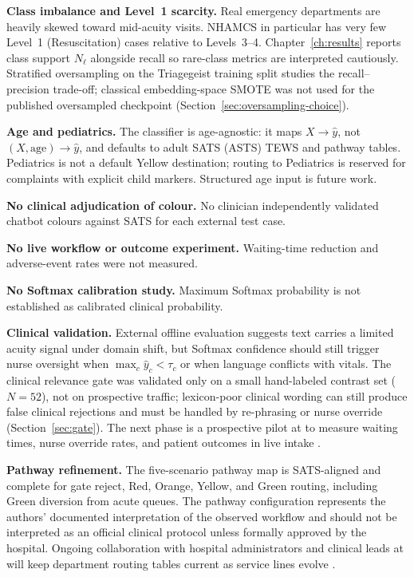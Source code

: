 \textbf{Class imbalance and Level~1 scarcity.} Real emergency departments are heavily skewed toward mid-acuity visits. NHAMCS in particular has very few Level~1 (Resuscitation) cases relative to Levels~3--4. Chapter~\ref{ch:results} reports class support \(N_\ell\) alongside recall so rare-class metrics are interpreted cautiously. Stratified oversampling on the Triagegeist training split studies the recall--precision trade-off; classical embedding-space SMOTE was not used for the published oversampled checkpoint (Section~\ref{sec:oversampling-choice}).

\textbf{Age and pediatrics.} The classifier is age-agnostic: it maps \(X\to\hat{y}\), not \((X,\mathrm{age})\to\hat{y}\), and defaults to adult SATS (ASTS) TEWS and pathway tables. Pediatrics is not a default Yellow destination; routing to Pediatrics is reserved for complaints with explicit child markers. Structured age input is future work.

\textbf{No clinical adjudication of colour.} No clinician independently validated chatbot colours against SATS for each external test case.

\textbf{No live workflow or outcome experiment.} Waiting-time reduction and adverse-event rates were not measured.

\textbf{No Softmax calibration study.} Maximum Softmax probability is not established as calibrated clinical probability.

\textbf{Clinical validation.} External offline evaluation suggests text carries a limited acuity signal under domain shift, but Softmax confidence should still trigger nurse oversight when \(\max_c\hat{y}_c < \tau_c\) or when language conflicts with vitals. The clinical relevance gate was validated only on a small hand-labeled contrast set (\(N=52\)), not on prospective \examplehospital{} traffic; lexicon-poor clinical wording can still produce false clinical rejections and must be handled by re-phrasing or nurse override (Section~\ref{sec:gate}). The next phase is a prospective pilot at \examplehospital{} to measure waiting times, nurse override rates, and patient outcomes in live intake \citep{Mitchell2023}.

\textbf{Pathway refinement.} The five-scenario pathway map is SATS-aligned and complete for gate reject, Red, Orange, Yellow, and Green routing, including Green diversion from acute queues. The pathway configuration represents the authors' documented interpretation of the observed workflow and should not be interpreted as an official clinical protocol unless formally approved by the hospital. Ongoing collaboration with hospital administrators and clinical leads at \examplehospital{} will keep department routing tables current as service lines evolve \citep{Rominski2014,satsmanual}.

